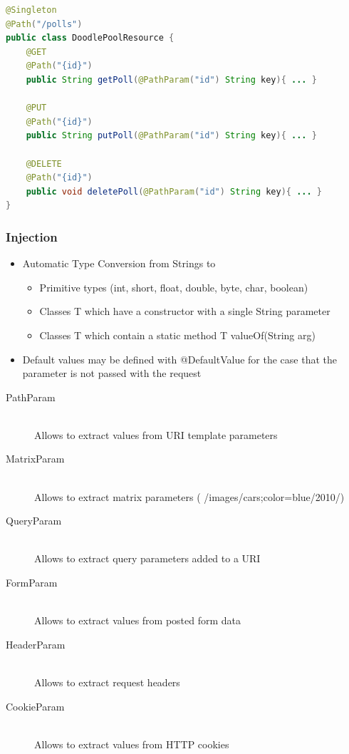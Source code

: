 \documentclass[10pt]{article}
\begin{document}
\begin{lstlisting}[language=Java, caption=JAX-RS Service = Annotated Java Class, style=JavaStyle]
@Singleton
@Path("/polls")
public class DoodlePoolResource {
	@GET
	@Path("{id}")
	public String getPoll(@PathParam("id") String key){ ... }
	
	@PUT
	@Path("{id}")
	public String putPoll(@PathParam("id") String key){ ... }
	
	@DELETE
	@Path("{id}")
	public void deletePoll(@PathParam("id") String key){ ... }
}
\end{lstlisting}
\subsubsection{Injection}
\begin{itemize}
	\item Automatic Type Conversion from Strings to
	\begin{itemize}
		\item Primitive types (int, short, float, double, byte, char, boolean)
		\item Classes T which have a constructor with a single String parameter
		\item Classes T which contain a static method T valueOf(String arg)
	\end{itemize}
	\item Default values may be defined with @DefaultValue for the case that the parameter is not passed with the request
\end{itemize}
\begin{description}
	\item[PathParam] \hfill \\
		Allows to extract values from URI template parameters
	\item[MatrixParam] \hfill \\
		Allows to extract matrix parameters ( /images/cars;color=blue/2010/)
	\item[QueryParam] \hfill \\
		Allows to extract query parameters added to a URI
	\item[FormParam] \hfill \\
		Allows to extract values from posted form data
	\item[HeaderParam] \hfill \\
		Allows to extract request headers
	\item[CookieParam] \hfill \\
		Allows to extract values from HTTP cookies
\end{description}
\end{document}
